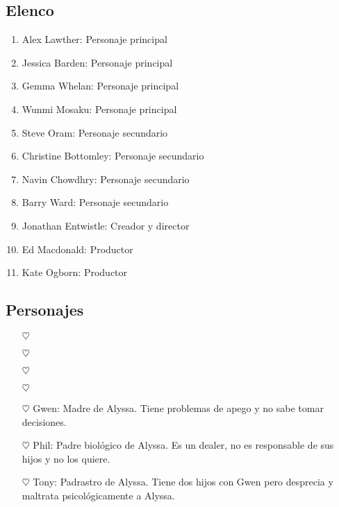 \documentclass[A5,11pt]{article}
\begin{document}
    \subsection{Elenco}
        \begin{enumerate}
            \item Alex Lawther: Personaje principal
            \item Jessica Barden: Personaje principal
            \item Gemma Whelan: Personaje principal
            \item Wunmi Mosaku: Personaje principal
            \item Steve Oram: Personaje secundario
            \item Christine Bottomley: Personaje secundario
            \item Navin Chowdhry: Personaje secundario
            \item Barry Ward: Personaje secundario
            \item Jonathan Entwistle: Creador y director
            \item Ed Macdonald: Productor
            \item Kate Ogborn: Productor
        \end{enumerate}
        
    \subsection{Personajes}
        \begin{itemize}
            \item [$\heartsuit$] 
            \item [$\heartsuit$] 
            \item [$\heartsuit$] 
            \item [$\heartsuit$] 
            \item [$\heartsuit$] Gwen: Madre de Alyssa. Tiene problemas de apego y no sabe tomar decisiones.
            \item [$\heartsuit$] Phil: Padre biológico de Alyssa. Es un dealer, no es responsable de sus hijos y no los quiere.
            \item [$\heartsuit$] Tony: Padrastro de Alyssa. Tiene dos hijos con Gwen pero desprecia y maltrata psicológicamente a Alyssa. 
        \end{itemize}
        
\end{document}
